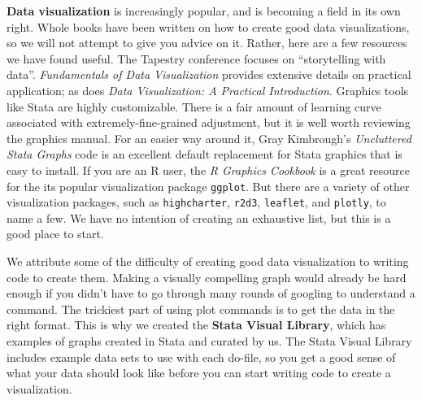 \textbf{Data visualization} 
is increasingly popular, and is becoming a field in its own right.\cite{healy2018data,wilke2019fundamentals}
Whole books have been written on how to create good data visualizations,
so we will not attempt to give you advice on it.
Rather, here are a few resources we have found useful.
The Tapestry conference focuses on ``storytelling with data''.
\textit{Fundamentals of Data Visualization} provides extensive details on practical application;
as does \textit{Data Visualization: A Practical Introduction}.
Graphics tools like Stata are highly customizable.
There is a fair amount of learning curve associated with extremely-fine-grained adjustment,
but it is well worth reviewing the graphics manual.
For an easier way around it, Gray Kimbrough's \textit{Uncluttered Stata Graphs}
code is an excellent default replacement for Stata graphics that is easy to install.
If you are an R user, the \textit{R Graphics Cookbook}
is a great resource for the its popular visualization package \texttt{ggplot}.
But there are a variety of other visualization packages,
such as \texttt{highcharter},
\texttt{r2d3},
\texttt{leaflet},
and \texttt{plotly}, to name a few.
We have no intention of creating an exhaustive list, but this is a good place to start.

We attribute some of the difficulty of creating good data visualization
to writing code to create them.
Making a visually compelling graph would already be hard enough if
you didn't have to go through many rounds of googling to understand a command.
The trickiest part of using plot commands is to get the data in the right format.
This is why we created the \textbf{Stata Visual Library},
which has examples of graphs created in Stata and curated by us.
The Stata Visual Library includes example data sets to use with each do-file,
so you get a good sense of what your data should look like
before you can start writing code to create a visualization.

